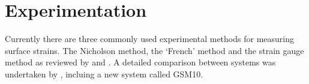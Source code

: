 \section{Experimentation}
Currently there are three commonly used experimental methods for measuring
surface strains. The Nicholson method, the `French' method and the strain
gauge method as reviewed by \cite{Murphy_2005} and \cite{yang2005measurement}. A detailed comparison between systems was undertaken by \cite{kamarudin2014new}, incluing a new system called GSM10.  